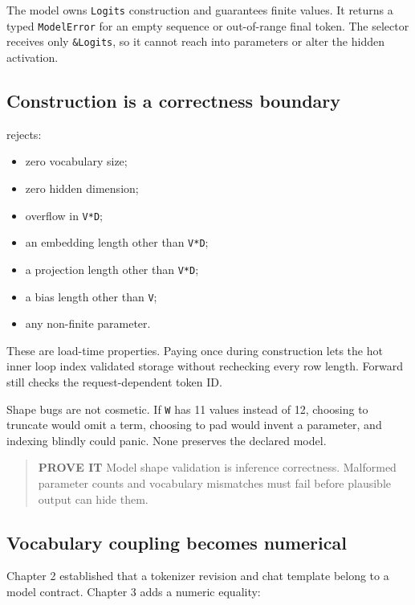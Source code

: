 The model owns \texttt{Logits} construction and guarantees finite
values. It returns a typed \texttt{ModelError} for an empty sequence or
out-of-range final token. The selector receives only \texttt{\&Logits},
so it cannot reach into parameters or alter the hidden activation.

\subsection{Construction is a correctness
boundary}\label{construction-is-a-correctness-boundary}

\texttt{} rejects:

\begin{itemize}
\tightlist
\item
  zero vocabulary size;
\item
  zero hidden dimension;
\item
  overflow in \texttt{V*D};
\item
  an embedding length other than \texttt{V*D};
\item
  a projection length other than \texttt{V*D};
\item
  a bias length other than \texttt{V};
\item
  any non-finite parameter.
\end{itemize}

These are load-time properties. Paying once during construction lets the
hot inner loop index validated storage without rechecking every row
length. Forward still checks the request-dependent token ID.

Shape bugs are not cosmetic. If \texttt{W} has 11 values instead of 12,
choosing to truncate would omit a term, choosing to pad would invent a
parameter, and indexing blindly could panic. None preserves the declared
model.

\begin{quote}
\textbf{PROVE IT} Model shape validation is inference correctness.
Malformed parameter counts and vocabulary mismatches must fail before
plausible output can hide them.
\end{quote}

\subsection{Vocabulary coupling becomes
numerical}\label{vocabulary-coupling-becomes-numerical}

Chapter 2 established that a tokenizer revision and chat template belong
to a model contract. Chapter 3 adds a numeric equality:

